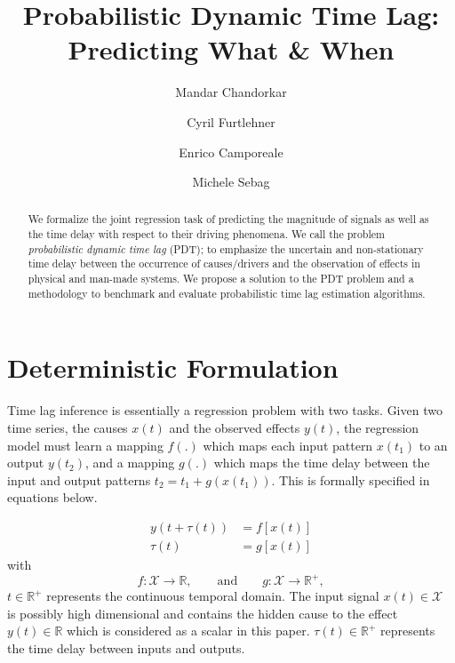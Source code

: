 \documentclass[envcountsect,runningheads]{llncs}
\theoremstyle{etoile}
\begin{document}
%
\title{Probabilistic Dynamic Time Lag: Predicting What \& When}
%
%
\author{Mandar Chandorkar \and
Cyril Furtlehner \and
Enrico Camporeale \and 
Michele Sebag
}
%
%
%
\maketitle              %
%
\begin{abstract}
      We formalize the joint regression task of predicting the magnitude of signals as well as the time delay with respect to their driving phenomena. 
      We call the problem \emph{probabilistic dynamic time lag} (PDT); to emphasize the uncertain and non-stationary time delay between the occurrence of 
      causes/drivers and the observation of effects in physical and man-made systems. We propose a solution to the PDT problem and a methodology to 
      benchmark and evaluate probabilistic time lag estimation algorithms.
\end{abstract}


\section{Deterministic Formulation}\label{sec:formulation}

Time lag inference is essentially a regression problem with two tasks. 
Given two time series, the causes $x(t)$ and the observed effects $y(t)$, the regression model 
must learn a mapping $f(.)$ which maps each input pattern $x(t_1)$ to an output $y(t_2)$, and a 
mapping $g(.)$ which maps the time delay between the input and output patterns $t_2 = t_1 + g(x(t_1))$. 
This is formally specified in equations below.

\begin{align}
y(t + \tau(t)) & = f[x(t)]\label{eq:pb1}\\
\tau(t) & = g[x(t)]\label{eq:pb2} 
\end{align}
with
\[
f: \mathcal{X}  \rightarrow \mathbb{R},\qquad\text{and}\qquad
g: \mathcal{X}  \rightarrow \mathbb{R}^{+},
\]
$t \in \mathbb{R}^{+}$ represents the continuous temporal domain. The input signal 
$x(t)\in \mathcal{X}$ is possibly high dimensional and contains the hidden cause to 
the effect $y(t)\in\mathbb{R}$ which is considered as a scalar in this paper. 
$\tau(t)\in \mathbb{R}^+$ represents the time delay between inputs and outputs.
\end{document}
